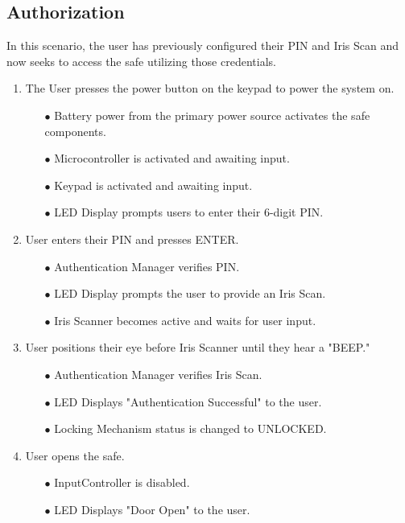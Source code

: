 \documentclass{article}
\begin{document}
\subsection{Authorization}
In this scenario, the user has previously configured their PIN and Iris Scan and now seeks to access the safe utilizing those credentials.

\begin{enumerate}
    \item The User presses the power button on the keypad to power the system on.
    \begin{enumerate}
        \item[$\bullet$] Battery power from the primary power source activates the safe components.
        \item[$\bullet$] Microcontroller is activated and awaiting input.
        \item[$\bullet$] Keypad is activated and awaiting input.
        \item[$\bullet$] LED Display prompts users to enter their 6-digit PIN.
    \end{enumerate}
    \item User enters their PIN and presses ENTER.
    \begin{enumerate}
        \item[$\bullet$] Authentication Manager verifies PIN.
        \item[$\bullet$] LED Display prompts the user to provide an Iris Scan.
        \item[$\bullet$] Iris Scanner becomes active and waits for user input.
    \end{enumerate}
    \item User positions their eye before Iris Scanner until they hear a "BEEP."
    \begin{enumerate}
        \item[$\bullet$] Authentication Manager verifies Iris Scan.
        \item[$\bullet$] LED Displays "Authentication Successful" to the user.
        \item[$\bullet$] Locking Mechanism status is changed to UNLOCKED.
    \end{enumerate}
    \item User opens the safe.
    \begin{enumerate}
        \item[$\bullet$] InputController is disabled.
        \item[$\bullet$] LED Displays "Door Open" to the user.

\end{enumerate}
\end{enumerate}
\end{document}
